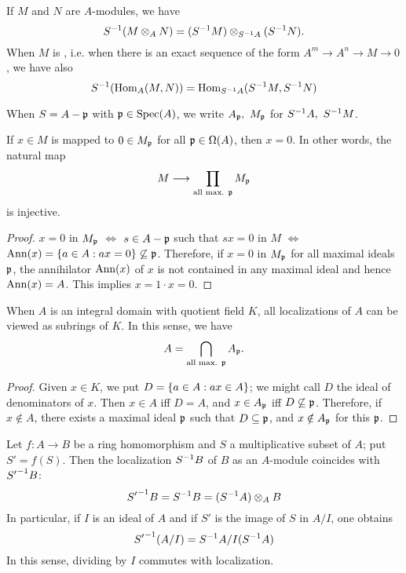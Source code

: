 \documentclass[../main]{subfiles}
\begin{document}
If $M$ and $N$ are $A$-modules, we have
\[S^{-1}(M \otimes_A N) = (S^{-1} M) \otimes_{S^{-1} A} (S^{-1} N).\]
When $M$ is , i.e. when there is an exact sequence of the form $A^m\longrightarrow A^n\longrightarrow M\longrightarrow 0$, we have also
\[S^{-1}(\operatorname{Hom}_A(M,N)) = \operatorname{Hom}_{S^{-1} A}(S^{-1} M,S^{-1} N)\]

\newparagraph
When $S=A-\mathfrak{p}$ with $\mathfrak{p}\in\operatorname{Spec}(A)$, we write $A_{\mathfrak{p}},~M_{\mathfrak{p}}$ for $S^{-1} A,~S^{-1} M$.

\begin{lemma}\label{lem:01.01}
If $x\in M$ is mapped to $0\in M_{\mathfrak{p}}$ for all $\mathfrak{p}\in\Omega(A)$, then $x=0$. In other words, the natural map
\[M \longrightarrow \prod_{\text{all max. }\mathfrak{p}}M_{\mathfrak{p}}\]
is injective.
\end{lemma}

\begin{proof}
$x=0$ in $M_{\mathfrak{p}}$ $\iff$ $s\in A-\mathfrak{p}$ such that $sx=0$ in $M$ $\iff$ $\operatorname{Ann}(x) = \left\{a\in A:ax=0\right\}\not\subseteq \mathfrak{p}$. Therefore, if $x=0$ in $M_{\mathfrak{p}}$ for all maximal ideals $\mathfrak{p}$, the annihilator $\operatorname{Ann}(x)$ of $x$ is not contained in any maximal ideal and hence $\operatorname{Ann}(x)=A$. This implies $x=1\cdot x=0$.
\end{proof}

\begin{lemma}\label{lem:01.02}
When $A$ is an integral domain with quotient field $K$, all localizations of $A$ can be viewed as subrings of $K$. In this sense, we have
\[A = \bigcap_{\text{all max. }\mathfrak{p}}A_{\mathfrak{p}}.\]
\end{lemma}

\begin{proof}
Given $x\in K$, we put $D=\left\{a\in A:ax\in A\right\}$; we might call $D$ the ideal of denominators of $x$. Then $x\in A$ iff $D=A$, and $x\in A_{\mathfrak{p}}$ iff $D\not\subseteq\mathfrak{p}$. Therefore, if $x\notin A$, there exists a maximal ideal $\mathfrak{p}$ such that $D\subseteq\mathfrak{p}$, and $x\notin A_{\mathfrak{p}}$ for this $\mathfrak{p}$.
\end{proof}

\newparagraph
Let $f:A\longrightarrow B$ be a ring homomorphism and $S$ a multiplicative subset of $A$; put $S'=f(S)$. Then the localization $S^{-1} B$ of $B$ as an $A$-module coincides with ${S'}^{-1} B$:
\begin{equation}\label{eqn:1.I.1}
{S'}^{-1} B = S^{-1} B = (S^{-1} A) \otimes_A B
\end{equation}
In particular, if $I$ is an ideal of $A$ and if $S'$ is the image of $S$ in $A/I$, one obtains
\begin{equation}\label{eqn:1.I.2}
{S'}^{-1}(A/I) = S^{-1} A/I(S^{-1} A)
\end{equation}
In this sense, dividing by $I$ commutes with localization.
\end{document}
